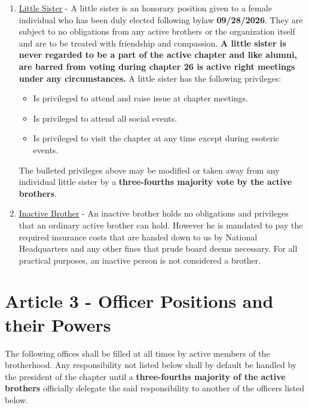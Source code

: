\documentclass{article}
\begin{document}
\begin{enumerate}
    \begin{itemize}
        \item Must pay all debts owed to the chapter in that were accrued as an active member.
        \item Is privileged to attend and raise issue at chapter meetings.
        \item Is privileged to attend all ritualistic events.
        \item Is privileged to attend all social events.
        \item Is privileged to visit the chapter at any time.
    \end{itemize}
    The bulleted obligations and privileges above may be modified or taken away from any individual alumnus by a \textbf{three-fifths majority vote by the active brothers}.
    \item  \underline{Little Sister} - A little sister is an honorary position given to a female individual who has been duly elected following bylaw \textbf{09/28/2026}. They are subject to no obligations from any active brothers or the organization itself and are to be treated with friendship and compassion. \textbf{A little sister is never regarded to be a part of the active chapter and like alumni, are barred from voting during chapter 26 is active right meetings under any circumstances.} A little sister has the following privileges:
    \begin{itemize}
        \item Is privileged to attend and raise issue at chapter meetings.
        \item Is privileged to attend all social events.
        \item Is privileged to visit the chapter at any time except during esoteric events.
    \end{itemize}
    The bulleted privileges above may be modified or taken away from any individual little sister by a \textbf{three-fourths majority vote by the active brothers}.
    \item \underline{Inactive Brother} - An inactive brother holds no obligations and privileges that an ordinary active brother can hold. However he is mandated to pay the required insurance costs that are handed down to us by National Headquarters and any other fines that prude board deems necessary. For all practical purposes, an inactive person is not considered a brother.
\end{enumerate}

\section*{Article 3 - Officer Positions and their Powers}
\hspace*{1cm}The following offices shall be filled at all times by active members of the brotherhood. Any responsibility not listed below shall by default be handled by the president of the chapter until a \textbf{three-fourths majority of the active brothers} officially delegate the said responsibility to another of the officers listed below.\\
\end{document}
